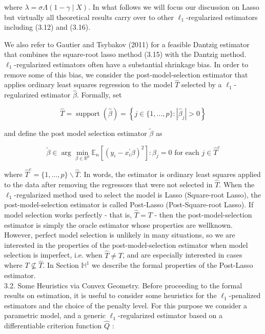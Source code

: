 \documentclass[10pt]{article}
\begin{document}
where \(\lambda=\sigma \Lambda(1-\gamma \mid X)\). In what follows we will focus our discussion on Lasso but virtually all theoretical results carry over to other \(\ell_{1}\)-regularized estimators including (3.12) and (3.16).

We also refer to Gautier and Tsybakov (2011) for a feasible Dantzig estimator that combines the square-root lasso method (3.15) with the Dantzig method.\\
\(\ell_{1}\)-regularized estimators often have a substantial shrinkage bias. In order to remove some of this bias, we consider the post-model-selection estimator that applies ordinary least squares regression to the model \(\widehat{T}\) selected by a \(\ell_{1}\)-regularized estimator \(\widehat{\beta}\). Formally, set

\[
\widehat{T}=\operatorname{support}(\widehat{\beta})=\left\{j \in\{1, \ldots, p\}:\left|\widehat{\beta}_{j}\right|>0\right\}
\]

and define the post model selection estimator \(\widetilde{\beta}\) as

\[
\widetilde{\beta} \in \arg \min _{\beta \in \mathbb{R}^{p}} \mathbb{E}_{n}\left[\left(y_{i}-x_{i}^{\prime} \beta\right)^{2}\right]: \beta_{j}=0 \text { for each } j \in \widehat{T}^{c}
\]

where \(\widehat{T}^{c}=\{1, \ldots, p\} \backslash \widehat{T}\). In words, the estimator is ordinary least squares applied to the data after removing the regressors that were not selected in \(\widehat{T}\). When the \(\ell_{1}\)-regularized method used to select the model is Lasso (Square-root Lasso), the post-model-selection estimator is called Post-Lasso (Post-Square-root Lasso). If model selection works perfectly - that is, \(\widehat{T}=T\) - then the post-model-selection estimator is simply the oracle estimator whose properties are wellknown. However, perfect model selection is unlikely in many situations, so we are interested in the properties of the post-model-selection estimator when model selection is imperfect, i.e. when \(\widehat{T} \neq T\), and are especially interested in cases where \(T \nsubseteq \widehat{T}\). In Section \(\mathbb{H}^{1}\) we describe the formal properties of the Post-Lasso estimator.\\
3.2. Some Heuristics via Convex Geometry. Before proceeding to the formal results on estimation, it is useful to consider some heuristics for the \(\ell_{1}\)-penalized estimators and the choice of the penalty level. For this purpose we consider a parametric model, and a generic \(\ell_{1}\)-regularized estimator based on a differentiable criterion function \(\widehat{Q}\) :
\end{document}
